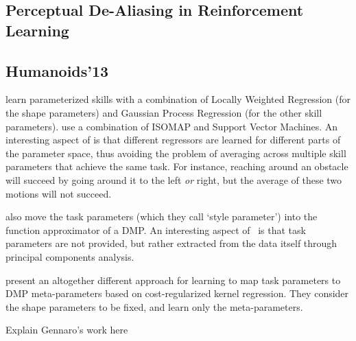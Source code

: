 \documentclass[12pt]{article}
\begin{document}
\citet{daniel12learning}

\subsection{Perceptual De-Aliasing in Reinforcement Learning}

\citet{chrisman92reinforcement}
\citet{mccallum95instancebased}
\citet{piater11learning}


\citet{marin12towards}


\color{red}
\subsection*{Humanoids'13}

\citet{ude10taskspecific} learn parameterized skills with a combination of Locally Weighted Regression (for the shape parameters) and Gaussian Process Regression (for the other skill parameters). 
\citet{silva12learning} use a combination of ISOMAP and Support Vector Machines. 
An interesting aspect of \cite{silva12learning} is that different regressors are learned for different parts of the parameter space, thus avoiding the problem of averaging across multiple skill parameters that achieve the same task. For instance, reaching around an obstacle will succeed  by going around it to the left \emph{or} right, but the average of these two motions will not succeed. 

\citet{matsubara11learning} also move the task parameters (which they call `style parameter') into the function approximator of a DMP. An interesting aspect of~\cite{matsubara11learning} is that task parameters are not provided, but rather extracted from the data itself through principal components analysis.

\citet{kober10reinforcement} present an altogether different approach for learning to map task parameters to DMP meta-parameters based on cost-regularized kernel regression. They consider the shape parameters to be fixed, and learn only the meta-parameters.

\color{black}

\color{red} Explain Gennaro's work here \color{black}
\end{document}
